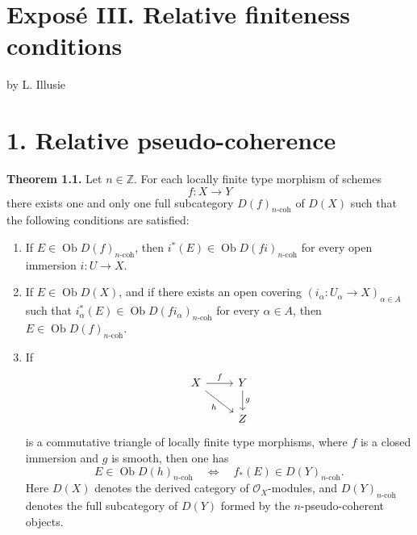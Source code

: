 \documentclass[11pt]{article}
\newcommand{\Spec}{\operatorname{Spec}}
\begin{document}
\providecommand{\Ob}{\operatorname{Ob}}
\providecommand{\qcoh}{\mathrm{qcoh}}
\providecommand{\coh}{\mathrm{coh}}
\providecommand{\torf}{\mathrm{torf}}
\providecommand{\toramp}{\operatorname{tor.amp}}
\providecommand{\amp}{\operatorname{amp}}
\providecommand{\Id}{\operatorname{Id}}
\providecommand{\pr}{\operatorname{pr}}
\providecommand{\coker}{\operatorname{coker}}
\providecommand{\im}{\operatorname{Im}}
\providecommand{\Spec}{\operatorname{Spec}}


\section*{Exposé III. Relative finiteness conditions}
\begin{center}
by L. Illusie
\end{center}

\section*{1. Relative pseudo-coherence}

\textbf{Theorem 1.1.} Let \(n\in \mathbb Z\). For each locally finite type morphism of schemes
\[
  f:X\longrightarrow Y
\]
there exists one and only one full subcategory \(D(f)_{n\text{-}\coh}\) of \(D(X)\) such that the following conditions are satisfied:

\begin{enumerate}[label=(\roman*)]
\item If \(E\in \Ob D(f)_{n\text{-}\coh}\), then \(i^*(E)\in \Ob D(fi)_{n\text{-}\coh}\) for every open immersion \(i:U\to X\).

\item If \(E\in \Ob D(X)\), and if there exists an open covering \((i_\alpha:U_\alpha\to X)_{\alpha\in A}\) such that \(i_\alpha^*(E)\in \Ob D(fi_\alpha)_{n\text{-}\coh}\) for every \(\alpha\in A\), then \(E\in \Ob D(f)_{n\text{-}\coh}\).

\item If
\[
\begin{tikzcd}
X \arrow[r,"f"] \arrow[dr,"h"'] & Y \arrow[d,"g"]\\
& Z
\end{tikzcd}
\]
is a commutative triangle of locally finite type morphisms, where \(f\) is a closed immersion and \(g\) is smooth, then one has
\[
  E\in \Ob D(h)_{n\text{-}\coh}
  \quad\Longleftrightarrow\quad
  f_*(E)\in D(Y)_{n\text{-}\coh}.
\]
Here \(D(X)\) denotes the derived category of \(\mathcal O_X\)-modules, and \(D(Y)_{n\text{-}\coh}\) denotes the full subcategory of \(D(Y)\) formed by the \(n\)-pseudo-coherent objects.
\end{enumerate}
\end{document}

